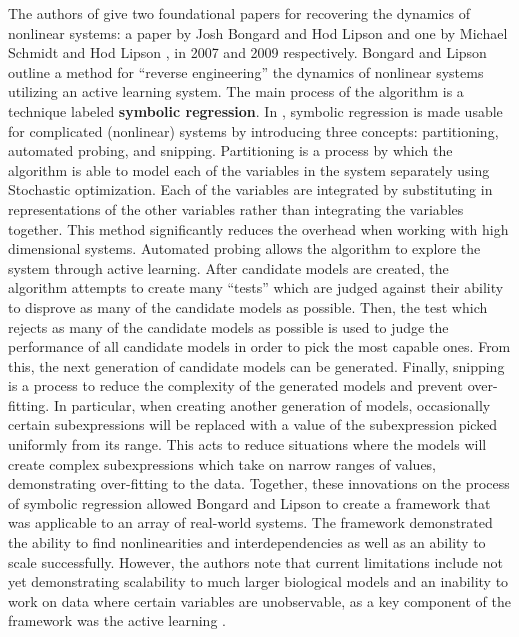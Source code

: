 \documentclass[10pt]{paper}
\begin{document}
The authors of \cite{sindy} give two foundational papers for recovering the dynamics of nonlinear systems: a paper by Josh Bongard and Hod Lipson \cite{bongard} and one by Michael Schmidt and Hod Lipson \cite{schmidt}, in 2007 and 2009 respectively.
Bongard and Lipson \cite{bongard} outline a method for ``reverse engineering'' the dynamics of nonlinear systems utilizing an active learning system. 
The main process of the algorithm is a technique labeled \textbf{symbolic regression}.
In \cite{bongard}, symbolic regression is made usable for complicated (nonlinear) systems by introducing three concepts: partitioning, automated probing, and snipping. Partitioning is a process by which the algorithm is able to model each of the variables in the system separately using Stochastic optimization. 
Each of the variables are integrated by substituting in representations of the other variables rather than integrating the variables together. This method significantly reduces the overhead when working with high dimensional systems. Automated probing allows the algorithm to explore the system through active learning. After candidate models are created, the algorithm attempts to create many ``tests'' which are judged against their ability to disprove as many of the candidate models as possible. Then, the test which rejects as many of the candidate models as possible is used to judge the performance of all candidate models in order to pick the most capable ones. From this, the next generation of candidate models can be generated. 
Finally, snipping is a process to reduce the complexity of the generated models and prevent over-fitting. In particular, when creating another generation of models, occasionally certain subexpressions will be replaced with a value of the subexpression picked uniformly from its range. This acts to reduce situations where the models will create complex subexpressions which take on narrow ranges of values, demonstrating over-fitting to the data. 
Together, these innovations on the process of symbolic regression allowed Bongard and Lipson to create a framework that was applicable to an array of real-world systems. The framework demonstrated the ability to find nonlinearities and interdependencies as well as an ability to scale successfully. However, the authors note that current limitations include not yet demonstrating scalability to much larger biological models and an inability to work on data where certain variables are unobservable, as a key component of the framework was the active learning \cite{bongard}. 
\end{document}

